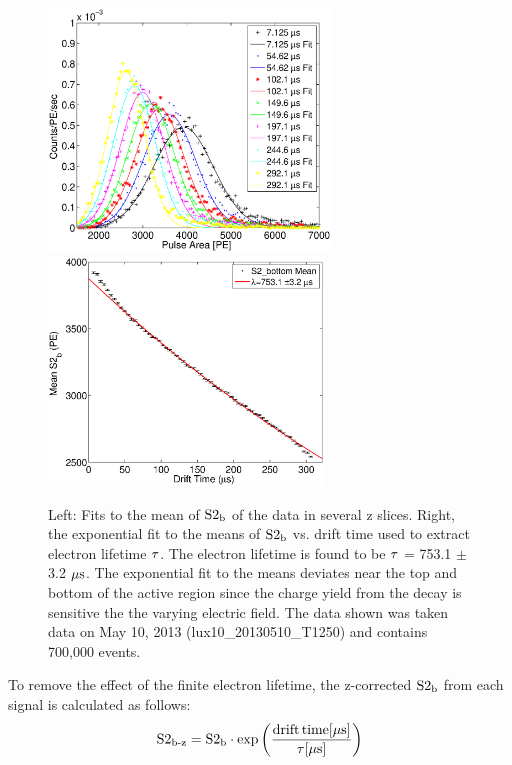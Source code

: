 \renewcommand{\baselinestretch}{1}
\small\normalsize
\begin{figure}[h!]\centering
\includegraphics[width=75mm]{Chapter_XYZ_Corr/Thesis_Corr_Plots/S2_bottom_hist_EL.eps}
\includegraphics[width=73mm]{Chapter_XYZ_Corr/Thesis_Corr_Plots/S2_bottom_lifetime.eps}
\caption{Left: Fits to the mean of $\rm S2_b$ of the \KrCal data in several z slices. Right, the exponential fit to the means of $\rm S2_b$ vs. drift time used to extract electron lifetime $\rm \tau$. The electron lifetime is found to be $\rm \tau$ = 753.1 $\pm$ 3.2 $\rm \mu s$. The exponential fit to the means deviates near the top and bottom of the active region since the charge yield from the \KrCal decay is sensitive the the varying electric field. The data shown was taken data on May 10, 2013 (lux10\_20130510\_T1250) and contains 700,000 \KrCal events. }
\label{fig:S2_EL}
\end{figure}
\renewcommand{\baselinestretch}{2}
\small\normalsize

To remove the effect of the finite electron lifetime, the z-corrected $\rm S2_b$ from each signal is calculated as follows:
\begin{equation}
\rm S2_{\operatorname{b-z}}=S2_b\cdot exp\left(\frac{drift\,time[\mu s]}{\tau[\mu s]}\right)
\label{eq:S2_Z}
\end{equation}

